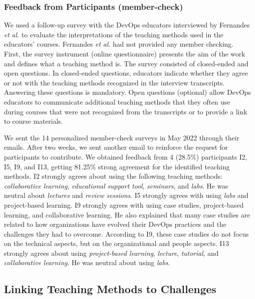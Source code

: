 \documentclass[10pt,conference]{IEEEtran}
\begin{document}
\subsubsection{Feedback from Participants (member-check)}

We used a follow-up survey with the DevOps educators interviewed by Fernandes \textit{et al.} \cite{fernandes:2022} to evaluate the interpretations of the teaching methods used in the educators' courses. Fernandes \textit{et al.} had not provided any member checking.
First, the survey instrument (online questionnaire) presents the aim of the work and defines what a teaching method is. The survey consisted of closed-ended and open questions. In closed-ended questions, educators indicate whether they agree or not with the teaching methods recognized in the interview transcripts. Answering these questions is mandatory.  
Open questions (optional) allow DevOps educators to communicate additional teaching methods that they often use during courses that were not recognized from the transcripts or to provide a link to course materials.

We sent the 14 personalized member-check surveys in May 2022 through their emails. After two weeks, we sent another email to reinforce the request for participants to contribute. We obtained feedback from 4 (28.5\%) participants I2, I5, I9, and I13, getting 
81.25\% strong agreement for the identified teaching methods. I2 strongly agrees about using the following teaching methods: \textsl{collaborative learning}, \textsl{educational support tool}, \textsl{seminars}, and \textsl{labs}. He was neutral about \textsl{lectures} and \textsl{review sessions}. I5 strongly agrees with using \textsl{labs} and project-based learning. I9 strongly agrees with using case studies, project-based learning, and collaborative learning. He also explained that many case studies are related to how organizations have evolved their DevOps practices and the challenges they had to overcome. According to I9, these case studies do not focus on the technical aspects, but on the organizational and people aspects. I13 strongly agrees about using \textsl{project-based learning}, \textsl{lecture}, \textsl{tutorial}, and \textsl{collaborative learning}. He was neutral about using \textsl{labs}. 





\subsection{Linking Teaching Methods to Challenges}
\end{document}
